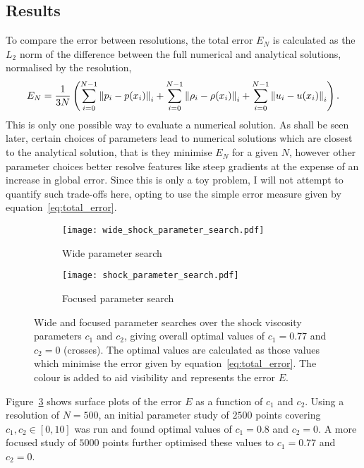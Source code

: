 \subsection{Results}

To compare the error between resolutions, the total error $E_N$ is calculated as the $L_2$ norm of the difference between the full numerical and analytical solutions, normalised by the resolution,
\begin{equation}
  \label{eq:total_error}
E_N = \frac{1}{3N} \left(
\sum_{i=0}^{N-1} \left\lVert p_i - p(x_i)\right\rVert_i
+ \sum_{i=0}^{N-1} \left\lVert\rho_i - \rho(x_i)\right\rVert_i
+ \sum_{i=0}^{N-1} \left\lVert u_i - u(x_i)\right\rVert_i \right).
\end{equation}
This is only one possible way to evaluate a numerical solution. As shall be seen later, certain choices of parameters lead to numerical solutions which are closest to the analytical solution, that is they minimise $E_N$ for a given $N$, however other parameter choices better resolve features like steep gradients at the expense of an increase in global error. Since this is only a toy problem, I will not attempt to quantify such trade-offs here, opting to use the simple error measure given by equation~\ref{eq:total_error}.

\begin{figure}[t]
    \hfill
    \begin{subfigure}{0.49\textwidth}
      \centering
      \texttt{[image: wide\_shock\_parameter\_search.pdf]}
      \caption{Wide parameter search}%
      \label{fig:wide_shock_parameter_search}
    \end{subfigure}
    \hfill
    \begin{subfigure}{0.49\textwidth}
      \texttt{[image: shock\_parameter\_search.pdf]}
      \caption{Focused parameter search}%
      \label{fig:shock_parameter_search}
    \end{subfigure}
    \caption{Wide and focused parameter searches over the shock viscosity parameters $c_1$ and $c_2$, giving overall optimal values of $c_1 = 0.77$ and $c_2 = 0$ (crosses). The optimal values are calculated as those values which minimise the error given by equation~\ref{eq:total_error}. The colour is added to aid visibility and represents the error $E$. }
\label{fig:shock_parameter_searches}%
\end{figure}


Figure~\ref{fig:shock_parameter_searches} shows surface plots of the error $E$ as a function of $c_1$ and $c_2$. Using a resolution of $N=500$, an initial parameter study of $2500$ points covering $c_1, c_2 \in [0, 10]$ was run and found optimal values of $c_1 = 0.8$ and $c_2 = 0$. A more focused study of $5000$ points further optimised these values to $c_1 = 0.77$ and $c_2 = 0$.

